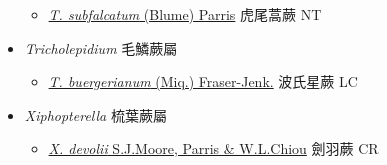 \begin{itemize}
  \begin{itemize}
        \item[] \href{http://www.theplantlist.org/tpl1.1/search?q=Tomophyllum+subfalcatum}{\textit{T. subfalcatum} (Blume) Parris}   虎尾蒿蕨   NT
  \end{itemize}
 \item[    ] \textit{Tricholepidium} 毛鱗蕨屬
                                
  \begin{itemize}
        \item[] \href{http://www.theplantlist.org/tpl1.1/search?q=Tricholepidium+buergerianum}{\textit{T. buergerianum} (Miq.) Fraser-Jenk.}   波氏星蕨   LC
  \end{itemize}
 \item[    ] \textit{Xiphopterella} 梳葉蕨屬
                                
  \begin{itemize}
        \item[] \href{http://www.theplantlist.org/tpl1.1/search?q=Xiphopterella+devolii}{\textit{X. devolii} S.J.Moore, Parris \& W.L.Chiou}   劍羽蕨   CR
  \end{itemize}
  \end{itemize}

